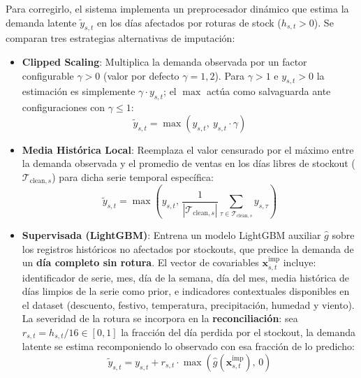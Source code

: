 Para corregirlo, el sistema implementa un preprocesador dinámico que estima la demanda latente $\tilde{y}_{s,t}$ en los días afectados por roturas de stock ($h_{s,t} > 0$). Se comparan tres estrategias alternativas de imputación:

\begin{itemize}
    \item \textbf{Clipped Scaling}: Multiplica la demanda observada por un factor configurable
    $\gamma > 0$ (valor por defecto $\gamma = 1{,}2$). Para $\gamma > 1$ e $y_{s,t} > 0$
    la estimación es simplemente $\gamma \cdot y_{s,t}$; el $\max$ actúa como salvaguarda
    ante configuraciones con $\gamma \leq 1$:
    \begin{equation}
        \tilde{y}_{s,t} = \max\!\left( y_{s,t},\ y_{s,t} \cdot \gamma \right)
    \end{equation}

    \item \textbf{Media Histórica Local}: Reemplaza el valor censurado por el máximo entre
    la demanda observada y el promedio de ventas en los días libres de stockout ($\mathcal{T}_{\text{clean},s}$)
    para dicha serie temporal específica:
    \begin{equation}
        \tilde{y}_{s,t} = \max \left( y_{s,t}, \, \frac{1}{|\mathcal{T}_{\text{clean},s}|}
        \sum_{\tau \in \mathcal{T}_{\text{clean},s}} y_{s,\tau} \right)
    \end{equation}

    \item \textbf{Supervisada (LightGBM)}: Entrena un modelo LightGBM auxiliar
    $\hat{g}$ sobre los registros históricos no afectados por stockouts, que predice la
    demanda de un \textbf{día completo sin rotura}. El vector de covariables $\mathbf{x}_{s,t}^{\text{imp}}$
    incluye: identificador de serie, mes, día de la semana, día del mes, media histórica
    de días limpios de la serie como prior, e indicadores contextuales disponibles en el
    dataset (descuento, festivo, temperatura, precipitación, humedad y viento). La
    severidad de la rotura se incorpora en la \textbf{reconciliación}: sea
    $r_{s,t} = h_{s,t}/16 \in [0, 1]$ la fracción del día perdida por el stockout, la demanda
    latente se estima recomponiendo lo observado con esa fracción de lo predicho:
    \begin{equation}
        \tilde{y}_{s,t} = y_{s,t} + r_{s,t} \cdot \max\!\left( \hat{g}(\mathbf{x}_{s,t}^{\text{imp}}),\, 0 \right)
    \end{equation}
\end{itemize}

